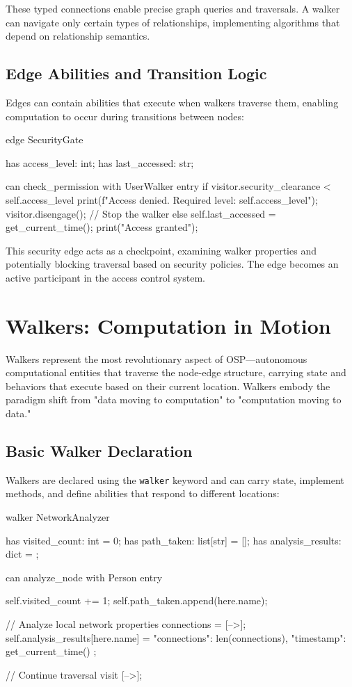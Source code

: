 These typed connections enable precise graph queries and traversals. A walker can navigate only certain types of relationships, implementing algorithms that depend on relationship semantics.

\subsection{Edge Abilities and Transition Logic}

Edges can contain abilities that execute when walkers traverse them, enabling computation to occur during transitions between nodes:

\begin{jacblock}
edge SecurityGate {
    has access_level: int;
    has last_accessed: str;

    can check_permission with UserWalker entry {
        if visitor.security_clearance < self.access_level {
            print(f"Access denied. Required level: {self.access_level}");
            visitor.disengage();  // Stop the walker
        } else {
            self.last_accessed = get_current_time();
            print("Access granted");
        }
    }
}
\end{jacblock}

This security edge acts as a checkpoint, examining walker properties and potentially blocking traversal based on security policies. The edge becomes an active participant in the access control system.

\section{Walkers: Computation in Motion}

Walkers represent the most revolutionary aspect of OSP—autonomous computational entities that traverse the node-edge structure, carrying state and behaviors that execute based on their current location. Walkers embody the paradigm shift from "data moving to computation" to "computation moving to data."

\subsection{Basic Walker Declaration}

Walkers are declared using the \texttt{walker} keyword and can carry state, implement methods, and define abilities that respond to different locations:

\begin{jacblock}
walker NetworkAnalyzer {
    has visited_count: int = 0;
    has path_taken: list[str] = [];
    has analysis_results: dict = {};

    can analyze_node with Person entry {
        self.visited_count += 1;
        self.path_taken.append(here.name);

        // Analyze local network properties
        connections = [-->];
        self.analysis_results[here.name] = {
            "connections": len(connections),
            "timestamp": get_current_time()
        };

        // Continue traversal
        visit [-->];
    }
}
\end{jacblock}

